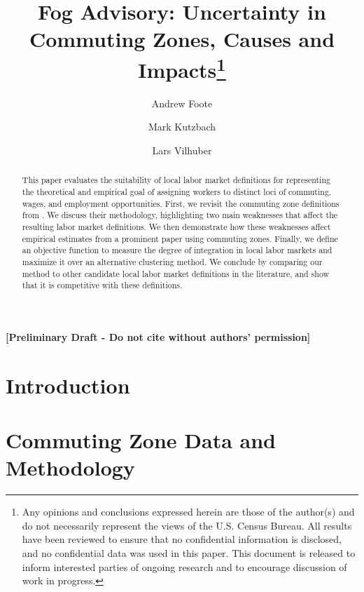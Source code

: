 \documentclass[12pt]{article}
\begin{document}
\title{Fog Advisory: Uncertainty in Commuting Zones, Causes and Impacts\thanks{Any opinions and conclusions expressed herein are those of the author(s) and do not necessarily represent the views of the U.S. Census Bureau. All results have been reviewed to ensure that no confidential information is disclosed, and no confidential data was used in this paper. This document is released to inform interested parties of ongoing research and to encourage discussion of work in progress.}}
\author[1]{Andrew Foote}
\author[1]{Mark Kutzbach}
\author[1,2]{Lars Vilhuber}
\maketitle


\textbf{[Preliminary Draft - Do not cite without authors' permission]}


\begin{abstract}
This paper evaluates the suitability of local labor market definitions for representing the theoretical and empirical goal of assigning workers to distinct loci of commuting, wages, and employment opportunities. First, we revisit the commuting zone definitions from \citet{TS1996}. We discuss their methodology, highlighting two main weaknesses that affect the resulting labor market definitions. We then demonstrate how these weaknesses affect empirical estimates from a prominent paper using commuting zones. Finally, we define an objective function to measure the degree of integration in local labor markets and maximize it over an alternative clustering method. We conclude by comparing our method to other candidate local labor market definitions in the literature, and show that it is competitive with these definitions.
\end{abstract}


\doublespacing

\section{Introduction \label{sec:intro}}


\section{Commuting Zone Data and Methodology \label{sec:method}}

\end{document}
